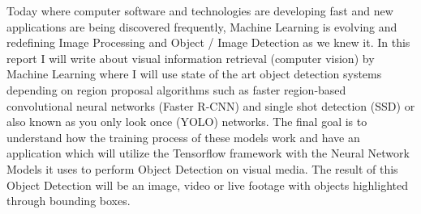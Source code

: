 
Today where computer software and technologies are developing fast and new applications are being discovered frequently, Machine
Learning is evolving and redefining Image Processing and Object / Image Detection as we knew it.
\newline
\newline
In this report I will write about visual information retrieval (computer vision) by Machine Learning where I will use state of the art object detection systems depending on region proposal algorithms such as faster region-based convolutional neural networks (Faster R-CNN) and single shot detection (SSD) or also known as you only look once (YOLO) networks.
\newline
\newline
The final goal is to understand how the training process of these models work and have an application which will utilize the Tensorflow framework with the Neural Network Models it uses to perform Object Detection on visual media. The result of this Object Detection will be an image, video or live footage with objects highlighted through bounding boxes.


